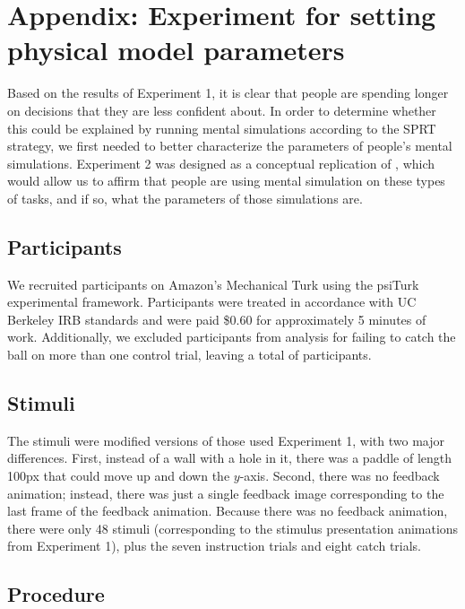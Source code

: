 \documentclass[10pt,letterpaper]{article}
\begin{document}
\section{Appendix: Experiment for setting physical model parameters}

Based on the results of Experiment 1, it is clear that people are spending longer on decisions that they are less confident about. In order to determine whether this could be explained by running mental simulations according to the SPRT strategy, we first needed to better characterize the parameters of people's mental simulations. Experiment 2 was designed as a conceptual replication of , which would allow us to affirm that people are using mental simulation on these types of tasks, and if so, what the parameters of those simulations are.

\subsection{Participants}

We recruited \PaddleNumComplete{} participants on Amazon's Mechanical Turk using the psiTurk \cite{McDonnell12} experimental framework. Participants were treated in accordance with UC Berkeley IRB standards and were paid \$0.60 for approximately 5 minutes of work. Additionally, we excluded \PaddleNumFailed{} participants from analysis for failing to catch the ball on more than one control trial, leaving a total of \PaddleNumOk{} participants.

\subsection{Stimuli}

The stimuli were modified versions of those used Experiment 1, with two major differences. First, instead of a wall with a hole in it, there was a paddle of length 100px that could move up and down the $y$-axis. Second, there was no feedback animation; instead, there was just a single feedback image corresponding to the last frame of the feedback animation. Because there was no feedback animation, there were only 48 stimuli (corresponding to the stimulus presentation animations from Experiment 1), plus the seven instruction trials and eight catch trials.

\subsection{Procedure}
\end{document}
